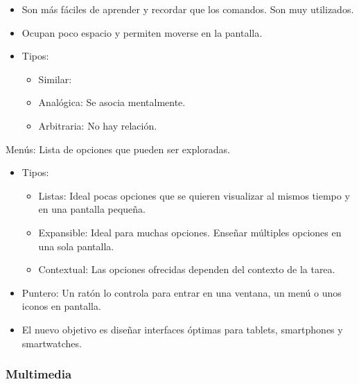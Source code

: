 \documentclass[12pt, twoside, openright]{report} %
\begin{document}
        \begin{itemize}
        
        \item
          Son más fáciles de aprender y recordar que los comandos. Son
          muy utilizados.
        \item
          Ocupan poco espacio y permiten moverse en la pantalla.
        \item
          Tipos:

          \begin{itemize}
          
          \item
            Similar:
          \item
            Analógica: Se asocia mentalmente.
          \item
            Arbitraria: No hay relación.
          \end{itemize}
        \end{itemize}

		Menús: Lista de opciones que pueden ser exploradas.

        \begin{itemize}
        
        \item
          Tipos:

          \begin{itemize}
          
          \item
            Listas: Ideal pocas opciones que se quieren visualizar al
            mismos tiempo y en una pantalla pequeña.
          \item
            Expansible: Ideal para muchas opciones. Enseñar múltiples
            opciones en una sola pantalla.
          \item
            Contextual: Las opciones ofrecidas dependen del contexto de
            la tarea.
          \end{itemize}

	\item
        Puntero: Un ratón lo controla para entrar en una ventana, un
        menú o unos iconos en pantalla.
      \item
        El nuevo objetivo es diseñar interfaces óptimas para tablets,
        smartphones y smartwatches.
      \end{itemize}

\subsubsection{Multimedia}	  
\end{document}
